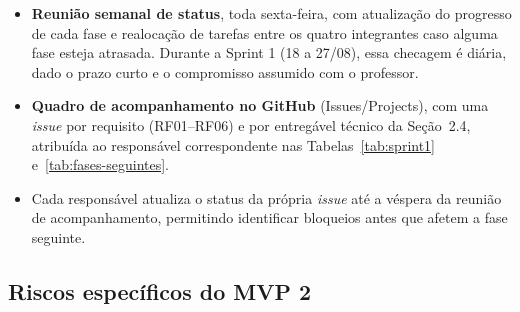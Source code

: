 \documentclass[11pt, a4paper]{article}
\begin{document}
\begin{itemize}
    \item \textbf{Reunião semanal de status}, toda sexta-feira, com atualização do progresso de cada fase e realocação de tarefas entre os quatro integrantes caso alguma fase esteja atrasada. Durante a Sprint 1 (18 a 27/08), essa checagem é diária, dado o prazo curto e o compromisso assumido com o professor.
    \item \textbf{Quadro de acompanhamento no GitHub} (Issues/Projects), com uma \emph{issue} por requisito (RF01--RF06) e por entregável técnico da Seção~2.4, atribuída ao responsável correspondente nas Tabelas~\ref{tab:sprint1} e~\ref{tab:fases-seguintes}.
    \item Cada responsável atualiza o status da própria \emph{issue} até a véspera da reunião de acompanhamento, permitindo identificar bloqueios antes que afetem a fase seguinte.
\end{itemize}

\subsection{Riscos específicos do MVP 2}
\label{sec:riscos-mvp2}
\end{document}
